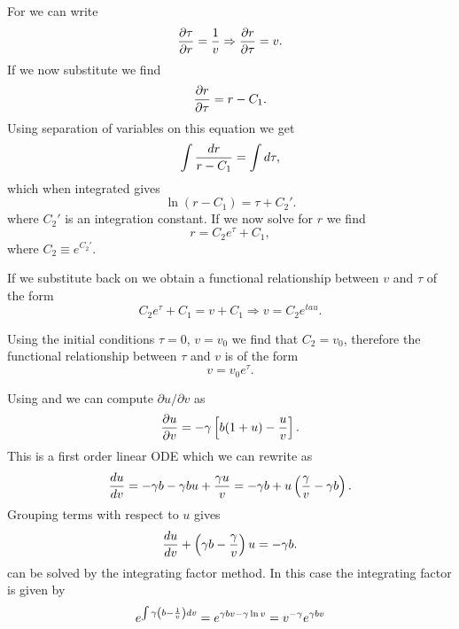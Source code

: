 For \eref[eq_ODE_3] we can write
\begin{equation}
  {\partial \tau \over \partial r} = {1 \over v} \Rightarrow
  {\partial r \over \partial \tau} = v.
\end{equation}
If we now substitute  we find
\begin{equation}
  {\partial r \over \partial \tau} = r - C_1.
\end{equation}
Using separation of variables on this equation we get
\begin{equation}
  \int {dr \over r - C_1} = \int d\tau,
\end{equation}
which when integrated gives
\begin{equation}
  \ln (r - C_1) = \tau + C_2'.
\end{equation}
where $C_2'$ is an integration constant. If we now solve for $r$ we find
\begin{equation}
  r = C_2e^{\tau} + C_1,
  \label{eq_ODE_sol_3}
\end{equation}
where $C_2 \equiv e^{C_2'}$.

If we substitute  back on  we obtain a
functional relationship between $v$ and $\tau$ of the form
\begin{equation}
  C_2 e^{\tau} + C_1 = v + C_1 \Rightarrow
  v = C_2 e^{tau}.
\end{equation}

Using the initial conditions $\tau = 0$, $v=v_0$ we find that $C_2 = v_0$,
therefore the functional relationship between $\tau$ and $v$ is of the form
\begin{equation}
  v = v_0 e^{\tau}.
  \label{eq_v_tau_relation}
\end{equation}

Using \eref[eq_ODE_1] and \eref[eq_ODE_2] we can compute
$\partial u / \partial v$ as
\begin{equation}
  {\partial u \over \partial v} =
  - \gamma \left[ b (1 + u) - {u \over v} \right].
\end{equation}
This is a first order linear ODE which we can rewrite as
\begin{equation}
  {du \over dv} = -\gamma b
  - \gamma b u
  + {\gamma u \over v} =
  -\gamma b
  + u \left( {\gamma \over v} - \gamma b \right).
\end{equation}
Grouping terms with respect to $u$ gives
\begin{equation}
  {du \over dv} + \left( \gamma b - {\gamma \over v} \right) u = - \gamma b.
  \label{eq_dudv}
\end{equation}
\eref[eq_dudv] can be solved by the integrating factor method. In this case
the integrating factor is given by
\begin{equation}
  e^{\int \gamma \left( b - {1 \over v} \right) dv} =
  e^{\gamma b v - \gamma \ln v} = v^{-\gamma} e^{\gamma b v}
  \label{eq_dudv_integ_factor}
\end{equation}

